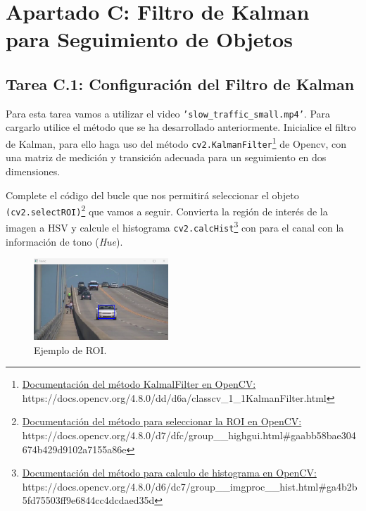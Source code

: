 \chapter{Apartado C: \textbf{Filtro de Kalman para Seguimiento de Objetos}}
\label{chapter:tarea_c}

\section*{Tarea C.1: Configuración del Filtro de Kalman}
{}
Para esta tarea vamos a utilizar el video \texttt{'slow\_traffic\_small.mp4'}. Para cargarlo utilice el método que se ha desarrollado anteriormente. Inicialice el filtro de Kalman, para ello haga uso del método \texttt{cv2.KalmanFilter}\footnote{ \href{https://docs.opencv.org/4.8.0/dd/d6a/classcv_1_1KalmanFilter.html}{Documentación del método KalmalFilter en OpenCV:} \\{https://docs.opencv.org/4.8.0/dd/d6a/classcv\_1\_1KalmanFilter.html}} de Opencv, con una matriz de medición y transición adecuada para un seguimiento en dos dimensiones.

Complete el código del bucle que nos permitirá seleccionar el objeto \texttt{(cv2.selectROI)}\footnote{ \href{https://docs.opencv.org/4.8.0/d7/dfc/group\_\_highgui.html\#gaabb58bae304674b429d9102a7155a86e}{Documentación del método para seleccionar la ROI en OpenCV:} \\{https://docs.opencv.org/4.8.0/d7/dfc/group\_\_highgui.html\#gaabb58bae304674b429d9102a7155a86e}} que vamos a seguir. Convierta la región de interés de la imagen a HSV y calcule el histograma \texttt{cv2.calcHist}\footnote{ \href{https://docs.opencv.org/4.8.0/d6/dc7/group\_\_imgproc\_\_hist.html\#ga4b2b5fd75503ff9e6844cc4dcdaed35d}{Documentación del método para calculo de histograma en OpenCV:} \\{https://docs.opencv.org/4.8.0/d6/dc7/group\_\_imgproc\_\_hist.html\#ga4b2b5fd75503ff9e6844cc4dcdaed35d}} con  para el canal con la información de tono (\textit{Hue}).

\begin{figure}[H]
    \centering
    \includegraphics[width=0.45\textwidth]{Lab_4/template/figures/roi_selection.png}
    \caption{Ejemplo de ROI.}
    \label{fig:ejemplo_ROI_kalman}
\end{figure}

